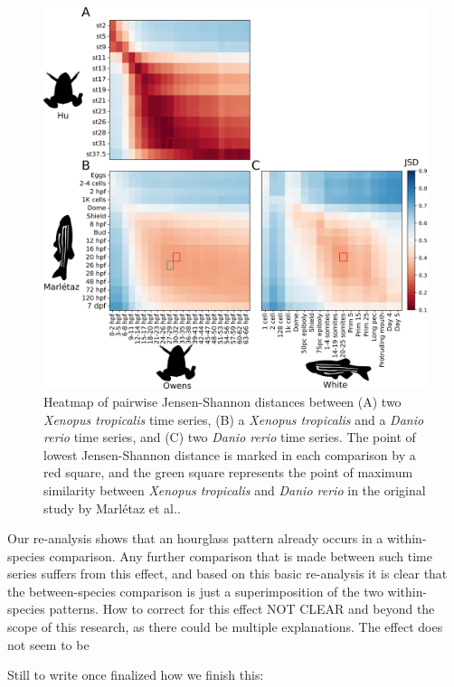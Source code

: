 \begin{figure}[H]
    \includegraphics[width=\linewidth]{ch4.hourglass/images/between_experiment.png}
    \caption{Heatmap of pairwise Jensen-Shannon distances between (A) two \textit{Xenopus tropicalis} time series, (B) a \textit{Xenopus tropicalis} and a \textit{Danio rerio} time series, and (C) two \textit{Danio rerio} time series. The point of lowest Jensen-Shannon distance is marked in each comparison by a red square, and the green square represents the point of maximum similarity between \textit{Xenopus tropicalis} and \textit{Danio rerio} in the original study by Marl\'etaz et al.\cite{marletaz2018}.}
    \label{fig:betweenexperiment}
\end{figure}

Our re-analysis shows that an hourglass pattern already occurs in a within-species comparison. Any further comparison that is made between such time series suffers from this effect, and based on this basic re-analysis it is clear that the between-species comparison is just a superimposition of the two within-species patterns. How to correct for this effect NOT CLEAR and beyond the scope of this research, as there could be multiple explanations. The effect does not seem to be 

Still to write once finalized how we finish this:

